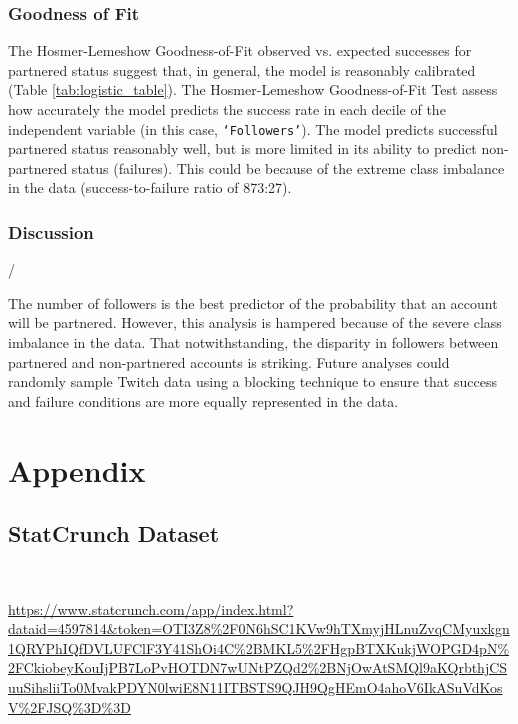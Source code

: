 \documentclass[12pt]{article}
\begin{document}
\subsubsection{Goodness of Fit}

The Hosmer-Lemeshow Goodness-of-Fit observed vs. expected successes for partnered status suggest that, in general, the model is reasonably calibrated (Table \ref{tab:logistic_table}). The Hosmer-Lemeshow Goodness-of-Fit Test assess how accurately the model predicts the success rate in each decile of the independent variable (in this case, \texttt{`Followers'}). The model predicts successful partnered status reasonably well, but is more limited in its ability to predict non-partnered status (failures). This could be because of the extreme class imbalance in the data (success-to-failure ratio of 873:27).

\subsubsection{Discussion}/

The number of followers is the best predictor of the probability that an account will be partnered. However, this analysis is hampered because of the severe class imbalance in the data. That notwithstanding, the disparity in followers between partnered and non-partnered accounts is striking.  Future analyses could randomly sample Twitch data using a blocking technique to ensure that success and failure conditions are more equally represented in the data.

\newpage

\section{Appendix}

\subsection{StatCrunch Dataset}\

\begin{tiny}
\url{https://www.statcrunch.com/app/index.html?dataid=4597814&token=OTI3Z8\%2F0N6hSC1KVw9hTXmyjHLnuZvqCMyuxkgn1QRYPhIQfDVLUFClF3Y41ShOi4C\%2BMKL5\%2FHgpBTXKukjWOPGD4pN\%2FCkiobeyKouIjPB7LoPvHOTDN7wUNtPZQd2\%2BNjOwAtSMQl9aKQrbthjCSuuSihsliiTo0MvakPDYN0lwiE8N11ITBSTS9QJH9QgHEmO4ahoV6IkASuVdKosV\%2FJSQ\%3D\%3D}
\end{tiny}
\end{document}
